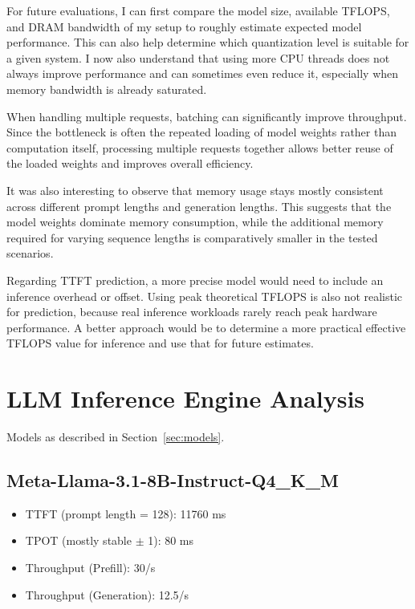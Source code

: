 \documentclass[11pt,a4paper]{article}
\begin{document}
For future evaluations, I can first compare the model size, available TFLOPS, and DRAM bandwidth of my setup to roughly estimate expected model performance.
This can also help determine which quantization level is suitable for a given system.
I now also understand that using more CPU threads does not always improve performance and can sometimes even reduce it, especially when memory bandwidth is already saturated.

When handling multiple requests, batching can significantly improve throughput.
Since the bottleneck is often the repeated loading of model weights rather than computation itself, processing multiple requests together allows better reuse of the loaded weights and improves overall efficiency.

It was also interesting to observe that memory usage stays mostly consistent across different prompt lengths and generation lengths.
This suggests that the model weights dominate memory consumption, while the additional memory required for varying sequence lengths is comparatively smaller in the tested scenarios.

Regarding TTFT prediction, a more precise model would need to include an inference overhead or offset.
Using peak theoretical TFLOPS is also not realistic for prediction, because real inference workloads rarely reach peak hardware performance.
A better approach would be to determine a more practical effective TFLOPS value for inference and use that for future estimates.

\newpage

\section{LLM Inference Engine Analysis}

Models as described in Section~\ref{sec:models}.

\subsection{Meta-Llama-3.1-8B-Instruct-Q4\_K\_M}

\begin{itemize}
    \item TTFT (prompt length = 128): 11760 ms
    \item TPOT (mostly stable $\pm$ 1): 80 ms
    \item Throughput (Prefill): 30/s
    \item Throughput (Generation): 12.5/s
\end{itemize}
\end{document}
